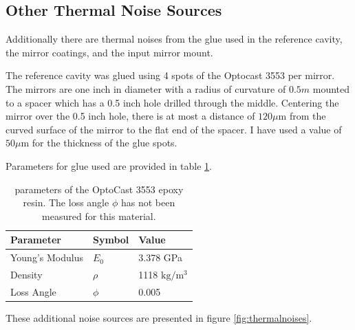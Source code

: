 \subsection{Other Thermal Noise Sources}

Additionally there are thermal noises from the glue used in the reference
cavity, the mirror coatings, and the input mirror mount.

The reference cavity was glued using 4 spots of the Optocast 3553 per mirror.
The mirrors are one inch in diameter with a radius of curvature of $0.5m$
mounted to a spacer which has a 0.5 inch hole drilled through the middle.
Centering the mirror over the 0.5 inch hole, there is at most a distance of
$120 \mu\mathrm{m}$ from the curved surface of the mirror to the flat end
of the spacer.
I have used a value of $50 \mu\mathrm{m}$ for the thickness of the glue spots.

Parameters for glue used are provided in table
\ref{tab:epoxyparams}.


\begin{table}
  \begin{center}
    \small
    \begin{tabular}{|l|l|l|}
      \hline
      Parameter & Symbol & Value \\
      \hline
      \hline
      Young's Modulus & $E_0$ & 3.378 GPa \\
      \hline
      Density & $\rho$ & 1118 $\mathrm{kg/m^3}$ \\
      \hline
      Loss Angle & $\phi$ & 0.005 \\
      \hline
    \end{tabular}
  \end{center}
  \caption[Epoxy Parameters]{
      parameters of the OptoCast 3553 epoxy resin.
      The loss angle $\phi$ has not been measured for this material.
      }
  \label{tab:epoxyparams}
\end{table}

These additional noise sources are presented in figure \ref{fig:thermalnoises}.

